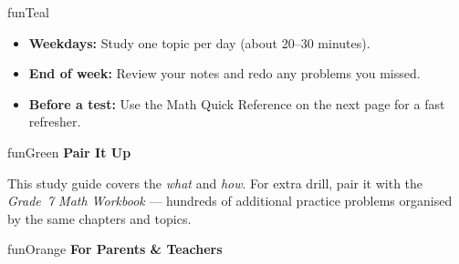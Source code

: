 {\begin{center}
\begin{minipage}{0.84\textwidth}
\begin{sgInfoPanel}{funTeal}
    \vspace{3mm}

    \begin{itemize}[leftmargin=1.2em, itemsep=2pt]
        \item[\textcolor{funTealDark}{\faAngleDoubleRight}]
            \textbf{Weekdays:} Study one topic per day
            (about 20--30 minutes).
        \item[\textcolor{funTealDark}{\faAngleDoubleRight}]
            \textbf{End of week:} Review your notes and redo any
            problems you missed.
        \item[\textcolor{funTealDark}{\faAngleDoubleRight}]
            \textbf{Before a test:} Use the Math Quick Reference
            on the next page for a fast refresher.
    \end{itemize}
\end{sgInfoPanel}
\end{minipage}
\end{center}

\vspace{4mm}

\begin{center}
\begin{minipage}{0.84\textwidth}
\begin{sgInfoPanel}{funGreen}
    {\bfseries\color{funGreenDark}\faLink\hspace{2mm}Pair It Up}

    \vspace{2mm}

    This study guide covers the \emph{what} and \emph{how}. For extra
    drill, pair it with the \textit{Grade~7 Math Workbook} ---
    hundreds of additional practice problems organised by the same
    chapters and topics.
\end{sgInfoPanel}
\end{minipage}
\end{center}

\vspace{4mm}

\begin{center}
\begin{minipage}{0.84\textwidth}
\begin{sgInfoPanel}{funOrange}
    {\bfseries\color{funOrangeDark}\faUsers\hspace{2mm}For Parents \& Teachers}


\end{sgInfoPanel}
\end{minipage}
\end{center}}
